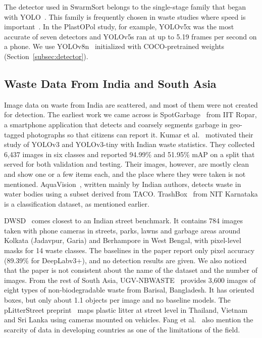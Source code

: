 The detector used in SwarmSort belongs to the single-stage family that began with YOLO~\cite{redmon2016you}. This family is frequently chosen in waste studies where speed is important~\cite{kumar2021novel,kraft2021autonomous,liao2022realtime,cordova2022litter}. In the PlastOPol study, for example, YOLOv5x was the most accurate of seven detectors and YOLOv5s ran at up to 5.19 frames per second on a phone. We use YOLOv8n~\cite{jocher2023ultralytics} initialized with COCO-pretrained weights~\cite{lin2014microsoft} (Section~\ref{subsec:detector}).

\subsection{Waste Data From India and South Asia}
\label{subsec:rw-india}

Image data on waste from India are scattered, and most of them were not created for detection. The earliest work we came across is SpotGarbage~\cite{mittal2016spotgarbage} from IIT Ropar, a smartphone application that detects and coarsely segments garbage in geo-tagged photographs so that citizens can report it. Kumar et al.~\cite{kumar2021novel} motivated their study of YOLOv3 and YOLOv3-tiny with Indian waste statistics. They collected 6,437 images in six classes and reported 94.99\% and 51.95\% mAP on a split that served for both validation and testing. Their images, however, are mostly clean and show one or a few items each, and the place where they were taken is not mentioned. AquaVision~\cite{panwar2020aquavision}, written mainly by Indian authors, detects waste in water bodies using a subset derived from TACO. TrashBox~\cite{kumsetty2022trashbox} from NIT Karnataka is a classification dataset, as mentioned earlier.

DWSD~\cite{ali2025dwsd} comes closest to an Indian street benchmark. It contains 784 images taken with phone cameras in streets, parks, lawns and garbage areas around Kolkata (Jadavpur, Garia) and Berhampore in West Bengal, with pixel-level masks for 14 waste classes. The baselines in the paper report only pixel accuracy (89.39\% for DeepLabv3+), and no detection results are given. We also noticed that the paper is not consistent about the name of the dataset and the number of images. From the rest of South Asia, UGV-NBWASTE~\cite{isalm2025ugvnbwaste} provides 3,600 images of eight types of non-biodegradable waste from Barisal, Bangladesh. It has oriented boxes, but only about 1.1 objects per image and no baseline models. The pLitterStreet preprint~\cite{mandhati2024plitterstreet} maps plastic litter at street level in Thailand, Vietnam and Sri Lanka using cameras mounted on vehicles. Fang et al.~\cite{fang2023artificial} also mention the scarcity of data in developing countries as one of the limitations of the field.

